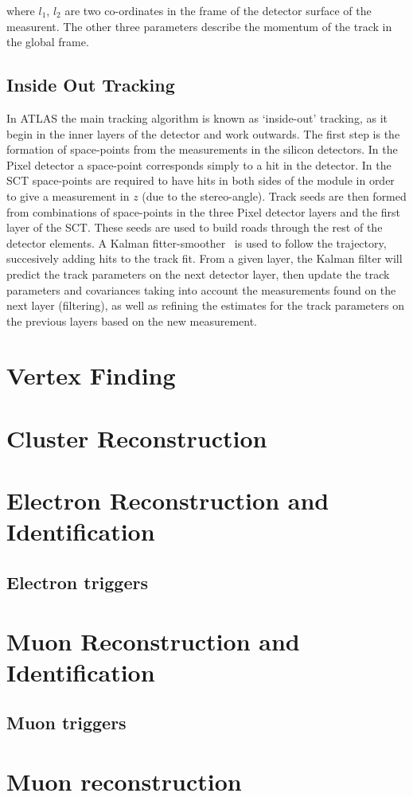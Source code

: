 where $l_{1}$, $l_{2}$ are two co-ordinates in the frame of the detector surface
of the measurent. The other three parameters describe the momentum of the track
in the global frame.

\subsection{Inside Out Tracking}

In ATLAS the main tracking algorithm is known as `inside-out' tracking, as it
begin in the inner layers of the detector and work outwards. The first step is
the formation of space-points from the measurements in the silicon detectors. In
the Pixel detector a space-point corresponds simply to a hit in the detector. In
the SCT space-points are required to have hits in both sides of the module in
order to give a measurement in $z$ (due to the stereo-angle). Track seeds are
then formed from combinations of space-points in the three Pixel detector layers
and the first layer of the SCT. These seeds are used to build roads through the
rest of the detector elements. A Kalman fitter-smoother~\cite{Fruhwirth:1987fm} is used to follow the
trajectory, succesively adding hits to the track fit. From a given layer, the
Kalman filter will predict the track parameters on the next detector layer, then
update the track parameters and covariances taking into account the measurements
found on the next layer (filtering), as well as refining the estimates for the
track parameters on the previous layers based on the new measurement.

\label{sec:reco-tracking}
\section{Vertex Finding}
\label{sec:reco-vertexing}
\section{Cluster Reconstruction}
\label{sec:reco-clustering}
\section{Electron Reconstruction and Identification}
\label{sec:reco-el}
\subsection{Electron triggers}
\label{sec:reco-triggers}
\section{Muon Reconstruction and Identification}
\label{sec:reco-mu}
\subsection{Muon triggers}
\label{sec:reco-triggers}
\section{Muon reconstruction}
